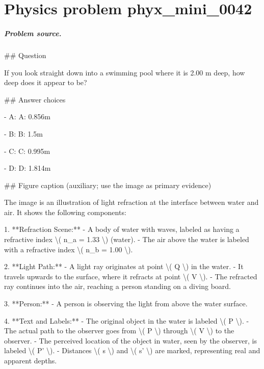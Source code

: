 
\chapter{Physics problem phyx\_mini\_0042}
\label{ch:PhyXMiniProblems_problem_phyx_mini_0042}

\paragraph{Problem source.}
\#\# Question

If you look straight down into a swimming pool where it is 2.00 m deep, how deep does it appear to be?

\#\# Answer choices

- A: A: 0.856m

- B: B: 1.5m

- C: C: 0.995m

- D: D: 1.814m

\#\# Figure caption (auxiliary; use the image as primary evidence)

The image is an illustration of light refraction at the interface between water and air. It shows the following components:

1. **Refraction Scene:**
   - A body of water with waves, labeled as having a refractive index \textbackslash{}( n\_a = 1.33 \textbackslash{}) (water).
   - The air above the water is labeled with a refractive index \textbackslash{}( n\_b = 1.00 \textbackslash{}).

2. **Light Path:**
   - A light ray originates at point \textbackslash{}( Q \textbackslash{}) in the water.
   - It travels upwards to the surface, where it refracts at point \textbackslash{}( V \textbackslash{}).
   - The refracted ray continues into the air, reaching a person standing on a diving board.

3. **Person:**
   - A person is observing the light from above the water surface.

4. **Text and Labels:**
   - The original object in the water is labeled \textbackslash{}( P \textbackslash{}).
   - The actual path to the observer goes from \textbackslash{}( P \textbackslash{}) through \textbackslash{}( V \textbackslash{}) to the observer.
   - The perceived location of the object in water, seen by the observer, is labeled \textbackslash{}( P' \textbackslash{}).
   - Distances \textbackslash{}( s \textbackslash{}) and \textbackslash{}( s' \textbackslash{}) are marked, representing real and apparent depths.

